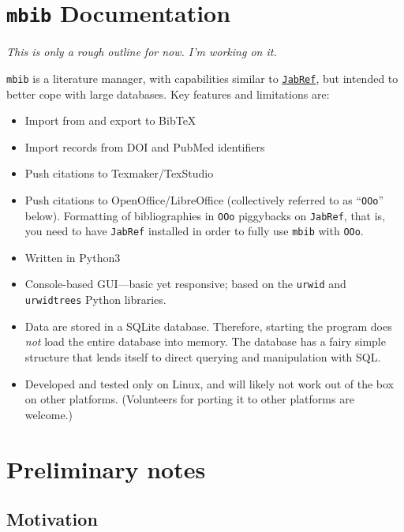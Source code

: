 \documentclass[10pt]{article}
\newcommand{\mbib}{\texttt{mbib}\xspace}
\newcommand{\jabref}{\texttt{JabRef}\xspace}
\newcommand*{\ooo}{\texttt{OOo}\xspace}
\begin{document}
\section*{\mbib Documentation}

\emph{This is only a rough outline for now. I'm working on it.}

\bigskip

\noindent \mbib is a literature manager, with capabilities similar to \href{http://www.jabref.org}{\jabref}, but intended to better cope with large databases.  Key features and limitations are:

\begin{itemize}
\item Import from and export to BibTeX  

\item Import records from DOI and PubMed identifiers

\item Push citations to Texmaker/TexStudio

\item Push citations to OpenOffice/LibreOffice (collectively referred to as ``\ooo'' below). Formatting of bibliographies in \ooo piggybacks on \jabref, that is, you need to have \jabref installed in order to fully use \mbib with \ooo.

\item Written in Python3

\item Console-based GUI---basic yet responsive; based on the \texttt{urwid} and
\texttt{urwidtrees} Python libraries. 

\item Data are stored in a SQLite database. Therefore, starting the program does \emph{not} load the entire database into memory. The database has a fairy simple structure that lends itself to direct querying and manipulation with SQL.

\item Developed and tested only on Linux, and will likely not work out of the box on other platforms. (Volunteers for porting it to other platforms are welcome.)

\end{itemize}

\section{Preliminary notes}

\subsection{Motivation}
\end{document}
